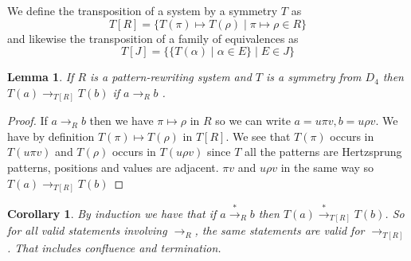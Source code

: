 \documentclass[a4paper, 11pt, english]{article}
\newcommand{\patternrule}{ \mapsto \!}
\newtheorem{lemma}[theorem]{Lemma}
\newtheorem{corollary}[theorem]{Corollary}
\theoremstyle{definition}
\newcommand{\tostar}{\stackrel{*}{\to}}
\begin{document}
We define the transposition of a system by a symmetry $T$ as
\begin{equation*}
  T[R] = \{T(\pi) \patternrule T(\rho) \mid \pi \patternrule \rho \in R \}
\end{equation*}
and likewise the transposition of a family of equivalences as
\begin{equation*}
  T[J] = \{ \{ T(\alpha) \mid \alpha \in E \} \mid E \in J \}
\end{equation*}

\begin{lemma}
    If $R$ is a pattern-rewriting system and $T$ is a symmetry from $D_4$ then 
    $T(a) \to_{T[R]} T(b)$ if $a \to_R b$ .
\end{lemma}
\begin{proof}
    If $a \to_R b$ then we have $\pi \patternrule \rho$ in $R$ so we can write $a = u \pi v, b = u
    \rho v$. We have by definition $T(\pi) \patternrule T(\rho)$ in $T[R]$. We see that $T(\pi)$
    occurs in $T(u \pi v)$ and $T(\rho)$ occurs in $T(u \rho v)$ since $T$ all the patterns are
    Hertzsprung patterns, positions and values are adjacent.
    $\pi v$ and $u \rho v$ in the same way so $T(a) \to_{T[R]} T(b)$
\end{proof}

\begin{corollary}
  By induction we have that if $a \tostar_R b$ then $T(a) \tostar_{T[R]} T(b)$. So for all
  valid statements involving $\to_R$, the same statements are valid for $\to_{T[R]}$. That includes
  confluence and termination.
\end{corollary}
\end{document}
